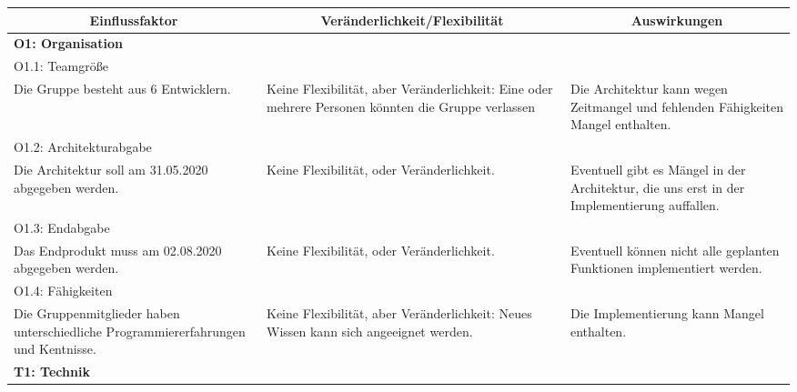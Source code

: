 \documentclass[fontsize=12pt,paper=a4,twoside]{scrartcl}
\begin{document}


\begin{longtable}[c]{|p{5cm}|p{5cm}|p{5cm}|}
\hline
\multicolumn{1}{|c|}{\textbf{Einflussfaktor}} & \multicolumn{1}{c|}{\textbf{Veränderlichkeit/Flexibilität}} & \multicolumn{1}{c|}{\textbf{Auswirkungen}}  \\ \hline
\endhead
\multicolumn{3}{|l|}{{\textbf{O1: Organisation}}} 
\\ \hline
\multicolumn{3}{|l|}{{O1.1: Teamgröße}} 
\\ \hline
Die Gruppe besteht aus 6 Entwicklern. & Keine Flexibilität, aber Veränderlichkeit: Eine oder mehrere Personen könnten die Gruppe verlassen      &  Die Architektur kann wegen Zeitmangel und fehlenden Fähigkeiten Mangel enthalten.
\\ \hline 
\multicolumn{3}{|l|}{{O1.2: Architekturabgabe}} 
\\ \hline
Die Architektur soll am 31.05.2020 abgegeben werden. & Keine Flexibilität, oder Veränderlichkeit.  & Eventuell gibt es Mängel in der Architektur, die uns erst in der Implementierung auffallen. 
\\ \hline             
\multicolumn{3}{|l|}{{O1.3: Endabgabe}} 
\\ \hline
Das Endprodukt muss am 02.08.2020 abgegeben werden. & Keine Flexibilität, oder Veränderlichkeit.   &  Eventuell können nicht alle geplanten Funktionen implementiert werden.
\\ \hline
\multicolumn{3}{|l|}{{O1.4: Fähigkeiten}} 
\\ \hline
Die Gruppenmitglieder haben unterschiedliche Programmiererfahrungen und Kentnisse. & Keine Flexibilität, aber Veränderlichkeit: Neues Wissen kann sich angeeignet werden.  & Die Implementierung kann Mangel enthalten. 
\\ \hline     
\multicolumn{3}{|l|}{{\textbf{T1: Technik}}} 
\\ \hline 

\end{longtable}
\end{document}
